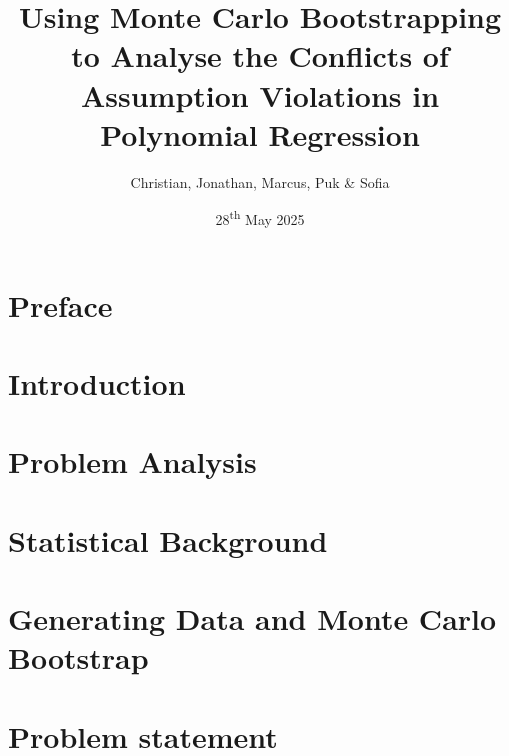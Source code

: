 \documentclass{article}
\title{Using Monte Carlo Bootstrapping to Analyse the Conflicts of Assumption Violations in Polynomial Regression\\}
\author{Christian, Jonathan, Marcus, Puk \& Sofia }
\date{28\textsuperscript{th} May 2025}
\begin{document}
	\setcounter{section}{0}
	
	
	\newpage
	\tableofcontents
	\newpage
	
	\section{Preface}
	
	\newpage
	
	\section{Introduction}
	
	\newpage
	
	\section{Problem Analysis}
	
	\newpage
	\newpage
	\section{Statistical Background}
	
	
	\newpage
 	
	\newpage
	
	\newpage
	\section{Generating Data and Monte Carlo Bootstrap}
	
	\newpage
	
	\newpage
	\section{Problem statement}
	
	\newpage
%	
	
	
%	
	
	
%	
	
\end{document}
